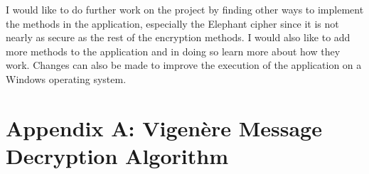 \documentclass[11pt]{article}
\begin{document}
		I would like to do further work on the project by finding other ways to implement the methods in the application, especially the Elephant cipher since it is not nearly as secure as the rest of the encryption methods. I would also like to add more methods to the application and in doing so learn more about how they work. Changes can also be made to improve the execution of the application on a Windows operating system.

		\newpage
		
		
		\thispagestyle{plain}
		\clearpage

    \section*{Appendix A: Vigen\`ere Message Decryption Algorithm}
\end{document}
